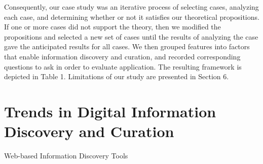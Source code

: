 \documentclass{casconpaper}
\begin{document}
{Consequently, our case study was an iterative process of selecting cases, analyzing each case, and determining whether or not it satisfies our theoretical propositions. If one or more cases did not support the theory, then we modified the propositions and selected a new set of cases until the results of analyzing the case gave the anticipated results for all cases. We then grouped features into factors that enable information discovery and curation, and recorded corresponding questions to ask in order to evaluate application. The resulting framework is depicted in Table 1. Limitations of our study are presented in Section 6.
} %


{\section{Trends in Digital Information Discovery and Curation}
\begin{table*}[htbp]
\small
\centering

\caption{Web-based Information Discovery Tools}


\end{table*}}
\end{document}
